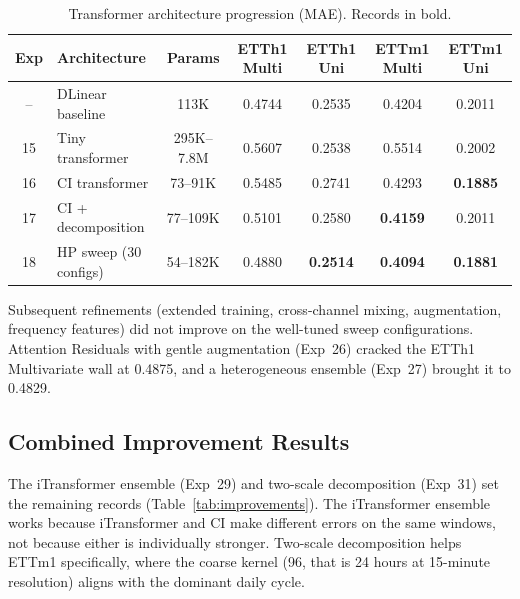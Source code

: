 \documentclass[conference]{IEEEtran}
\begin{document}
\begin{table}[t]
\caption{Transformer architecture progression (MAE). Records in bold.}
\label{tab:progression}
\centering
\small
\begin{tabular}{clccccc}
\toprule
Exp & Architecture & Params & ETTh1 Multi & ETTh1 Uni & ETTm1 Multi & ETTm1 Uni \\
\midrule
--  & DLinear baseline      & 113K       & 0.4744 & 0.2535 & 0.4204 & 0.2011 \\
15  & Tiny transformer      & 295K--7.8M & 0.5607 & 0.2538 & 0.5514 & 0.2002 \\
16  & CI transformer        & 73--91K    & 0.5485 & 0.2741 & 0.4293 & \textbf{0.1885} \\
17  & CI + decomposition    & 77--109K   & 0.5101 & 0.2580 & \textbf{0.4159} & 0.2011 \\
18  & HP sweep (30 configs) & 54--182K   & 0.4880 & \textbf{0.2514} & \textbf{0.4094} & \textbf{0.1881} \\
\bottomrule
\end{tabular}
\end{table}

Subsequent refinements (extended training, cross-channel mixing, augmentation, frequency features) did not improve on the well-tuned sweep configurations. Attention Residuals with gentle augmentation (Exp~26) cracked the ETTh1 Multivariate wall at 0.4875, and a heterogeneous ensemble (Exp~27) brought it to 0.4829.

\subsection{Combined Improvement Results}
The iTransformer ensemble (Exp~29) and two-scale decomposition (Exp~31) set the remaining records (Table~\ref{tab:improvements}). The iTransformer ensemble works because iTransformer and CI make different errors on the same windows, not because either is individually stronger. Two-scale decomposition helps ETTm1 specifically, where the coarse kernel (96, that is 24 hours at 15-minute resolution) aligns with the dominant daily cycle.

\begin{table}[t]
\caption{iTransformer ensemble (Exp 29) and two-scale (Exp 31) versus the CI+Decomp submission, MAE.}
\label{tab:improvements}
\centering
\small
{}
\end{table}
\end{document}
